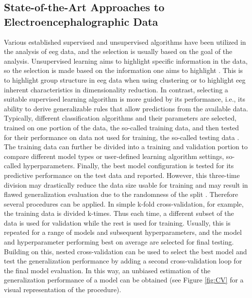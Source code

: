\subsection{State-of-the-Art Approaches to Electroencephalographic Data}
\label{theory:ml:applications_eeg}
Various established supervised and unsupervised algorithms have been utilized in the analysis of \gls{eeg} data, and the selection is usually based on the goal of the analysis. Unsupervised learning aims to highlight specific information in the data, so the selection is made based on the information one aims to highlight \cite{Shalev2014}. This is to highlight group structure in \gls{eeg} data when using clustering or to highlight \gls{eeg} inherent characteristics in dimensionality reduction. In contrast, selecting a suitable supervised learning algorithm is more guided by its performance, i.e., its ability to derive generalizable rules that allow predictions from the available data. Typically, different classification algorithms and their parameters are selected, trained on one portion of the data, the so-called training data, and then tested for their performance on data not used for training, the so-called testing data \cite{Daumé2017}. The training data can further be divided into a training and validation portion to compare different model types or user-defined learning algorithm settings, so-called hyperparameters. Finally, the best model configuration is tested for its predictive performance on the test data and reported. However, this three-time division may drastically reduce the data size usable for training and may result in flawed generalization evaluation due to the randomness of the split \cite{Varoquaux2017}. Therefore several procedures can be applied. In simple k-fold cross-validation, for example, the training data is divided k-times. Thus each time, a different subset of the data is used for validation while the rest is used for training. Usually, this is repeated for a range of models and subsequent hyperparameters, and the model and hyperparameter performing best on average are selected for final testing. Building on this, 
nested cross-validation can be used to select the best model and test the generalization performance by adding a second cross-validation loop for the final model evaluation. In this way, an unbiased estimation of the generalization performance of a model can be obtained (see Figure \ref{fig:CV} for a visual representation of the procedure).

\begin{figure*}[ht]
\centering
  
  \captionsetup{justification=justified}
  \caption[Exemplary nested cross-validation procedure.]{Exemplary nested cross-validation procedure. K-fold cross-validation is used in an outer loop for testing the best configuration tuned in an inner cross-validation loop. CV: cross-validation, Val: Validation}
  \label{fig:CV}
\end{figure*}

